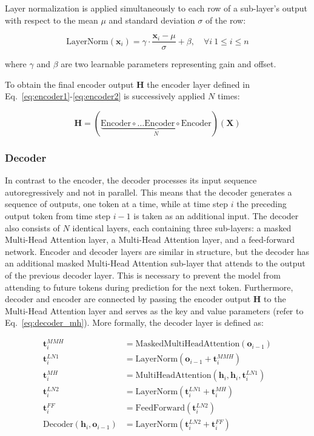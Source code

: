 Layer normalization is applied simultaneously to each row of a sub-layer's
output with respect to the mean $\mu$ and standard deviation $\sigma$ of the
row:

\begin{equation}
    \text{LayerNorm}(\bm{x}_i) = \gamma \cdot \frac{\bm{x}_i - \mu}{\sigma} + \beta, 
    \quad \forall i \ 1 \leq i \leq n
\end{equation}

where $\gamma$ and $\beta$ are two learnable parameters representing gain and
offset.

To obtain the final encoder output $\bm{H}$ the encoder layer defined in
Eq.~\ref{eq:encoder1}-\ref{eq:encoder2} is successively applied $N$ times:

\begin{equation}
    \bm{H} = \left(\underbrace{\text{Encoder} \circ \ldots \text{Encoder} \circ \text{Encoder}}_{N}\right)(\bm{X})
\end{equation}

\subsubsection{Decoder}
In contrast to the encoder, the decoder processes its input sequence
autoregressively and not in parallel. This means that the decoder generates a
sequence of outputs, one token at a time, while at time step $i$ the preceding
output token from time step $i-1$ is taken as an additional input. The decoder
also consists of $N$ identical layers, each containing three sub-layers: a
masked Multi-Head Attention layer, a Multi-Head Attention layer, and a
feed-forward network. Encoder and decoder layers are similar in structure, but
the decoder has an additional masked Multi-Head Attention sub-layer that attends
to the output of the previous decoder layer. This is necessary to prevent the
model from attending to future tokens during prediction for the next token.
Furthermore, decoder and encoder are connected by passing the encoder output
$\bm{H}$ to the Multi-Head Attention layer and serves as the key and value
parameters (refer to Eq.~\ref{eq:decoder_mh}). More formally, the decoder layer
is defined as:

\begin{align}
    \label{eq:decoder1}
    \bm{t}_i^{MMH} &= \text{MaskedMultiHeadAttention}(\bm{o}_{i-1}) \\ 
    \bm{t}_i^{LN1} &= \text{LayerNorm}(\bm{o}_{i-1} + \bm{t}_i^{MMH}) \\
    \label{eq:decoder_mh}
    \bm{t}_i^{MH} &= \text{MultiHeadAttention}(\bm{h}_i, \bm{h}_i, \bm{t}_i^{LN1}) \\
    \bm{t}_i^{LN2} &= \text{LayerNorm}(\bm{t}_i^{LN1} + \bm{t}_i^{MH}) \\
    \bm{t}_i^{FF} &= \text{FeedForward}(\bm{t}_i^{LN2}) \\
    \label{eq:decoder2}
    \text{Decoder}(\bm{h}_i, \bm{o}_{i-1}) &= \text{LayerNorm}(\bm{t}_i^{LN2} + \bm{t}_i^{FF})
\end{align}

